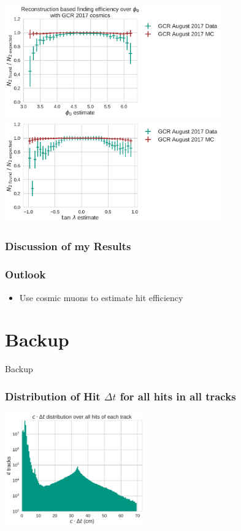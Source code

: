 \documentclass[18pt]{beamer}
\begin{document}
\begin{frame}
  \includegraphics[width=0.7\textwidth]{figures/efficiency_study/cosmicbased_findeff_over_phi0.pdf}\\
  \includegraphics[width=0.7\textwidth]{figures/efficiency_study/cosmicbased_findeff_over_tan_lambda.pdf}
\end{frame}

\begin{frame}
  \frametitle{Discussion of my Results}
  
\end{frame}

\begin{frame}
  \frametitle{Outlook}
  \begin{itemize}
  \item Use cosmic muons to estimate hit efficiency
  \end{itemize}
\end{frame}

\section{Backup}

\begin{frame}
  \begin{center}
    \huge Backup
  \end{center}
\end{frame}



\begin{frame}
  \frametitle{Distribution of Hit $\Delta t$ for all hits in all tracks}  
  \begin{center}
    \includegraphics[width=0.45\textwidth]{figures/delta_t/gcraugust_delta_t_log.pdf}
  \end{center}
\end{frame}
\end{document}
